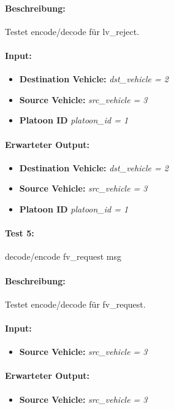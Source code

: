 \documentclass[a4paper, 12pt, titlepage]{scrartcl}
\begin{document}
{			\paragraph{Beschreibung:} Testet encode/decode für lv\_reject.
			\paragraph{Input:}
			\begin{itemize} \itemsep-0.5em
				\item \textbf{Destination Vehicle:} \emph{dst\_vehicle = 2}
				\item \textbf{Source Vehicle:} \emph{src\_vehicle = 3}
				\item \textbf{Platoon ID} \emph{platoon\_id = 1}
			\end{itemize}
			\paragraph{Erwarteter Output:}
			\begin{itemize} \itemsep-0.5em
				\item \textbf{Destination Vehicle:} \emph{dst\_vehicle = 2}
				\item \textbf{Source Vehicle:} \emph{src\_vehicle = 3}
				\item \textbf{Platoon ID} \emph{platoon\_id = 1}
			\end{itemize}
			
			
			\paragraph{Test 5:}{decode/encode fv\_request msg}
			\paragraph{Beschreibung:} Testet encode/decode für fv\_request.
			\paragraph{Input:}
			\begin{itemize} \itemsep-0.5em
				\item \textbf{Source Vehicle:} \emph{src\_vehicle = 3}
			\end{itemize}
			\paragraph{Erwarteter Output:}
			\begin{itemize} \itemsep-0.5em
				\item \textbf{Source Vehicle:} \emph{src\_vehicle = 3}
			\end{itemize}		

}
\end{document}
